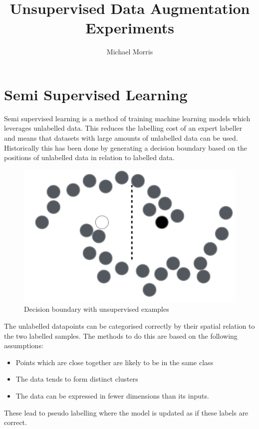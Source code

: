 \documentclass[a4paper]{article}
\title{Unsupervised Data Augmentation Experiments}
\author{Michael Morris}
\begin{document}
\maketitle
\section{Semi Supervised Learning}
Semi supervised learning is a method of training machine learning models which leverages unlabelled data. This reduces the labelling cost of an expert labeller and means that datasets with large amounts of unlabelled data can be used. Historically this has been done by generating a decision boundary based on the positions of unlabelled data in relation to labelled data. 

\begin{figure}[h]
  \begin{center}
    \includegraphics[width=.4\textwidth]{SSL}
    \caption{Decision boundary with unsupervised examples}
  \end{center}
\end{figure}
The unlabelled datapoints can be categorised correctly by their spatial relation to the two labelled samples. The methods to do this are based on the following assumptions:
\begin{itemize}
  \item Points which are close together are likely to be in the same class 
  \item The data tends to form distinct clusters
  \item The data can be expressed in fewer dimensions than its inputs.
\end{itemize}
These lead to pseudo labelling where the model is updated as if these labels are correct. 
\end{document}

